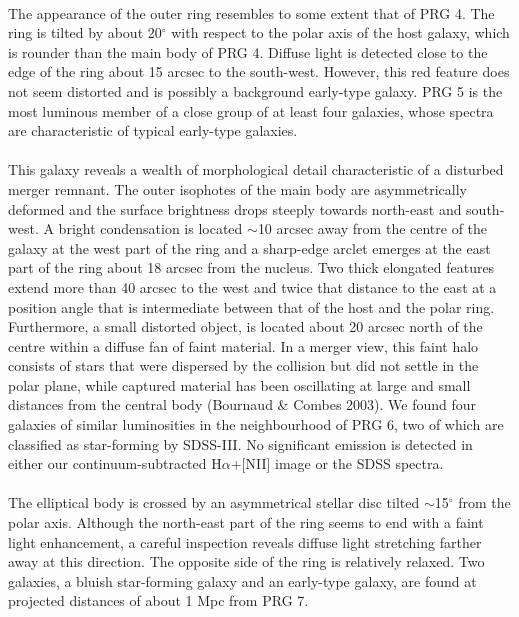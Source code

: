 \documentclass[useAMS,usenatbib]{mn2e}
\begin{document}
\\
The appearance of the outer ring resembles to some extent that of PRG 4. The ring is tilted by about 20$^\circ$ with respect to the polar axis of the host galaxy, which is rounder than the main body of PRG 4. 
Diffuse light is detected close to the edge of the ring about 15 arcsec to the south-west. However, this red feature does not seem distorted and is possibly a background early-type galaxy.
PRG 5 is the most luminous member of a close group of at least four galaxies, whose spectra are characteristic of typical early-type galaxies. \\

\\
This galaxy reveals a wealth of morphological detail characteristic of a disturbed merger remnant.
The outer isophotes of the main body are asymmetrically deformed and the surface brightness drops steeply towards north-east and south-west.  
A bright condensation is located $\sim$10 arcsec away from the centre of the galaxy at the west part of the ring and a sharp-edge arclet emerges at the east part of the ring about 18 arcsec from the nucleus.
Two thick elongated features extend more than 40 arcsec to the west and twice that distance to the east at a position angle that is intermediate between 
that of the host and the polar ring.
Furthermore, a small distorted object, is located about 20 arcsec north of the centre within a diffuse fan of faint material. 
In a merger view, this faint halo consists of stars that were dispersed by the collision but did not settle in the polar plane, while captured material has been oscillating at large and small distances from the central body (Bournaud \& Combes 2003). 
We found four galaxies of similar luminosities in the neighbourhood of PRG 6, two of which are classified as star-forming by SDSS-III.
No significant emission is detected in either our continuum-subtracted H$\alpha$+[NII] image or the SDSS spectra.\\

\\
The elliptical body is crossed by an asymmetrical stellar disc tilted $\sim$15$^\circ$ from the polar axis. 
Although the north-east part of the ring seems to end with a faint light enhancement, a careful inspection reveals diffuse light stretching farther away at this direction. The opposite side of the ring is relatively relaxed.
Two galaxies, a bluish star-forming galaxy and an early-type galaxy, are found at projected distances of about 1 Mpc from PRG 7. \\
\end{document}
